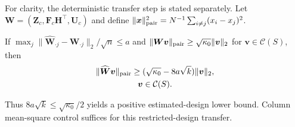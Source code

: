 For clarity, the deterministic transfer step is stated separately. Let $\bm{W}=(\bm{Z}_c,\bm{F}_c\bm{H}^\top,\bm{U}_c)$ and define $\|\bm{x}\|_{\rm pair}^2=N^{-1}\sum_{i\ne j}(x_i-x_j)^2$.
\begin{lemma}
\label{lem:design-transfer}
If $\max_j\|\widehat{\bm{W}}_{\cdot j}-\bm{W}_{\cdot j}\|_2/\sqrt n\le a$ and $\|\bm{W}\bm{v}\|_{\rm pair}\ge\sqrt{\kappa_0}\|\bm{v}\|_2$ for $\bm{v}\in\mathcal C(S)$, then
\begin{equation}
 \begin{gathered}
\|\widehat{\bm{W}}\bm{v}\|_{\rm pair}
 \ge(\sqrt{\kappa_0}-8a\sqrt{k})\|\bm{v}\|_2,
 \\
 \bm{v}\in\mathcal C(S).
 \end{gathered}
 \label{eq:design-transfer-bound}
\end{equation}
\end{lemma}
Thus $8a\sqrt{k}\le\sqrt{\kappa_0}/2$ yields a positive estimated-design lower bound. Column mean-square control suffices for this restricted-design transfer.


